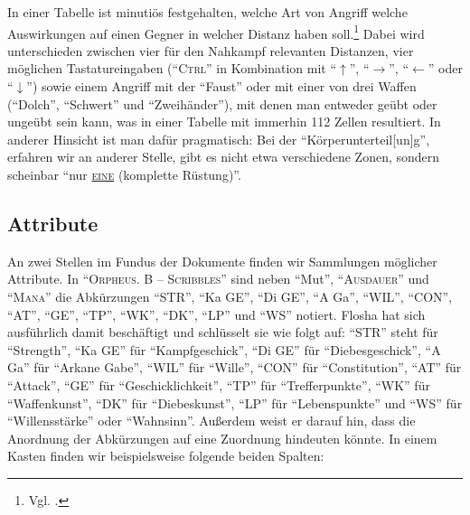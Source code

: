 \documentclass[a5paper,pagesize,numbers=noenddot]{scrbook}
\begin{document}
In einer Tabelle ist minutiös festgehalten, welche Art von Angriff welche Auswirkungen auf einen Gegner in welcher Distanz haben soll.\footnote{Vgl. \autocite[S.~4--5]{orpheus_kampfsteuerung}.}
Dabei wird unterschieden zwischen vier für den Nahkampf relevanten Distanzen, vier möglichen Tastatureingaben (\enquote{\textsc{Ctrl}} in Kombination mit \enquote{$\uparrow$}, \enquote{$\rightarrow$}, \enquote{$\leftarrow$} oder \enquote{$\downarrow$}) sowie einem Angriff mit der \enquote{Faust} oder mit einer von drei Waffen (\enquote{Dolch}, \enquote{Schwert} und \enquote{Zweihänder}), mit denen man entweder geübt oder ungeübt sein kann, was in einer Tabelle mit immerhin 112 Zellen resultiert.\autocite[S.~4]{orpheus_kampfsteuerung}
In anderer Hinsicht ist man dafür pragmatisch:
Bei der \enquote{Körperunterteil[un]g}, erfahren wir an anderer Stelle, gibt es nicht etwa verschiedene Zonen, sondern scheinbar \enquote{nur \uline{\textsc{eine}} (komplette Rüstung)}.\autocite[S.~8]{orpheus_b_scribbles}


\subsection{Attribute}\label{sec:orpheus_mechanik_attribute}
An zwei Stellen im Fundus der Dokumente finden wir Sammlungen möglicher Attribute.
In \enquote{\textsc{Orpheus. B -- Scribbles}} sind neben \enquote{Mut}, \enquote{\textsc{Ausdauer}} und \enquote{\textsc{Mana}} die Abkürzungen \enquote{STR}, \enquote{Ka GE}, \enquote{Di GE}, \enquote{A Ga}, \enquote{WIL}, \enquote{CON}, \enquote{AT}, \enquote{GE}, \enquote{TP}, \enquote{WK}, \enquote{DK}, \enquote{LP} und \enquote{WS} notiert.
Flosha hat sich ausführlich damit beschäftigt und schlüsselt sie wie folgt auf:
\enquote{STR} steht für \enquote{Strength}, \enquote{Ka GE} für \enquote{Kampfgeschick}, \enquote{Di GE} für \enquote{Diebesgeschick}, \enquote{A Ga} für \enquote{Arkane Gabe}, \enquote{WIL} für \enquote{Wille}, \enquote{CON} für \enquote{Constitution}, \enquote{AT} für \enquote{Attack}, \enquote{GE} für \enquote{Geschicklichkeit}, \enquote{TP} für \enquote{Trefferpunkte}, \enquote{WK} für \enquote{Waffenkunst}, \enquote{DK} für \enquote{Diebeskunst}, \enquote{LP} für \enquote{Lebenspunkte} und \enquote{WS} für \enquote{Willensstärke} oder \enquote{Wahnsinn}.
Außerdem weist er darauf hin, dass die Anordnung der Abkürzungen auf eine Zuordnung hindeuten könnte.\autocite[Vgl.][]{flosha_attributes_2022}
In einem Kasten finden wir beispielsweise folgende beiden Spalten:
\end{document}
